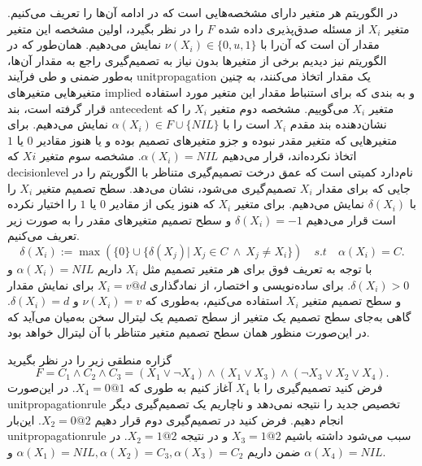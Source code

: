  در الگوریتم‌
 هر متغیر دارای مشخصه‌هایی است که در ادامه آن‌ها را تعریف می‌کنیم. متغیر  
 $X_{i}$
 از مسئله صدق‌پذیری داده شده 
 $F$
 را در نظر بگیرد،   اولین مشخصه  این متغیر مقدار آن است که آن‌را با 
 $\nu(X_{i})\in \{0, u, 1\}$
نمایش می‌دهیم.  همان‌طور که در الگوریتم 
نیز دیدیم برخی از متغیرها بدون نیاز به تصمیم‌گیری راجع به مقدار آن‌ها، به‌طور ضمنی و طی فرآیند 
\gls*{unitpropagation}
یک مقدار اتخاذ می‌کنند، به چنین متغیرهایی متغیرهای 
\gls*{implied}
و به بندی که برای استنباط مقدار این متغیر مورد استفاده قرار گرفته است،  بند 
\gls*{antecedent}
متغیر 
$X_{i}$
می‌گوییم. مشخصه دوم متغیر 
$X_{i}$
را که نشان‌دهنده بند مقدم 
$X_{i}$
است را  با 
{\footnotesize $\alpha(X_{i})\in F\cup \{NIL\}$}
نمایش می‌دهیم. برای متغیرهایی که متغیر مقدر نبوده  و جزو متغیرهای تصمیم  بوده و یا هنوز مقادیر 
$0$
یا 
$1$
اتخاذ نکرده‌اند، قرار می‌دهیم 
$\alpha(X_{i}) = NIL$. 
مشخصه سوم متغیر 
$X{i}$
که 
\gls*{decisionlevel}
نام‌دارد کمیتی است که عمق درخت تصمیم‌گیری متناظر با  الگوریتم 
را در جایی که  برای  مقدار 
$X_{i}$
تصمیم‌گیری می‌شود، نشان می‌دهد.  سطح تصمیم متغیر 
$X_{i}$
را با 
$\delta(X_{i})$
نمایش می‌دهیم. برای متغیر 
$X_{i}$
که هنوز  یکی از مقادیر 
$0$
یا 
$1$
را اختیار نکرده است قرار می‌دهیم 
$\delta(X_{i}) = -1$
و سطح تصمیم متغیرهای مقدر را به صورت زیر تعریف می‌کنیم.
\begin{equation*}
\delta(X_{i}):= \max(\{0\}\cup \{\delta(X_{j})| \ X_{j} \in C \ \wedge \ X_{j} \neq X_{i}\}) \quad s.t \quad \alpha(X_{i}) = C.
\end{equation*}
با توجه به تعریف فوق برای هر متغیر تصمیم مثل 
$X_{i}$
داریم 
$\alpha(X_{i}) = NIL$
و 
$\delta(X_{i}) > 0$.
برای ساده‌نویسی و اختصار، از نمادگذاری 
$X_{i} = v @ d$
برای نمایش مقدار و سطح تصمیم متغیر 
$X_{i}$
استفاده می‌کنیم، به‌طوری که 
$\nu(X_{i}) = v$
و 
$\delta(X_{i}) = d$.
 گاهی به‌جای سطح تصمیم یک متغیر از سطح تصمیم یک لیترال  سخن به‌میان می‌آید که در این‌صورت منظور همان سطح تصمیم متغیر متناظر با آن لیترال خواهد بود. 
 \begin{example}
 گزاره منطقی زیر را در نظر بگیرید 
 \begin{equation*}
 F  = C_{1}\wedge C_{2}\wedge C_{3} = (X_{1}\vee \neg X_{4})\wedge (X_{1}\vee X_{3})\wedge (\neg X_{3}\vee X_{2}\vee X_{4}).
 \end{equation*}
 فرض کنید تصمیم‌گیری را با 
 $X_{4}$
 آغاز کنیم به طوری که 
 $X_{4} = 0@ 1$.
 در این‌صورت 
 \gls*{unitpropagationrule} 
تخصیص جدید را نتیجه نمی‌دهد و ناچاریم یک تصمیم‌گیری دیگر انجام دهیم. فرض کنید در تصمیم‌گیری دوم قرار دهیم 
$X_{2} = 0@2$. 
این‌بار 
\gls*{unitpropagationrule}
سبب می‌شود داشته باشیم 
$X_{3} = 1@2$
و در نتیجه 
$X_{2} = 1@2$. 
در ضمن داریم 
$\alpha(X_{1}) = NIL, \alpha(X_{2}) = C_{3}, \alpha(X_{3}) = C_{2}$
و 
$\alpha(X_{4}) = NIL$.
 \end{example}
